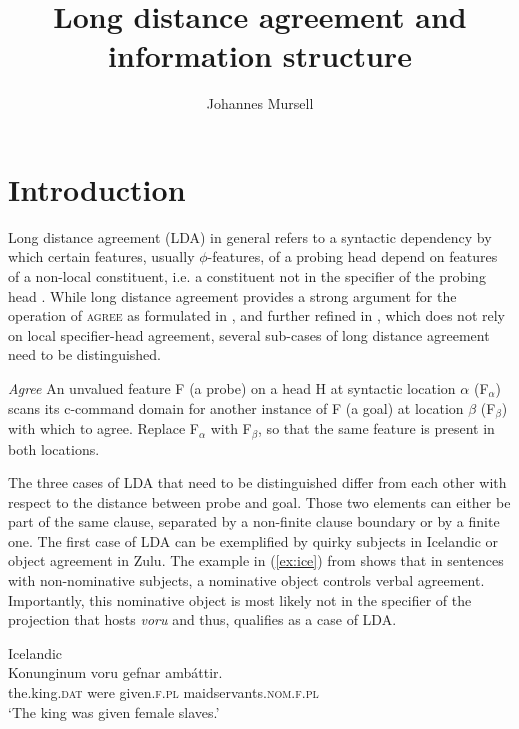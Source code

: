 \documentclass[output=paper
,modfonts
,nonflat]{langsci/langscibook}
\title{Long distance agreement and information structure}
\author{Johannes Mursell\affiliation{Goethe-Universität Frankfurt am Main}}
\begin{document}
\maketitle

\section{Introduction} 
Long distance agreement (LDA) in general refers to a syntactic dependency by which certain features, usually $ \phi $-features, of a probing head depend on features of a non-local constituent, i.e. a constituent not in the specifier of the probing head \citep{Bhatt_Keine2016}. While long distance agreement provides a strong argument for the operation of \textsc{agree} as formulated in \citet{Chomsky2000,Chomsky2001}, and further refined in \citet{Pesetsky_Torrego2007}, which does not rely on local specifier-head agreement, several sub-cases of long distance agreement need to be distinguished.
\begin{exe} 
\ex \label{def:agr_pt} \textit{Agree} \citep[][268]{Pesetsky_Torrego2007}
	\xlist
	\ex An unvalued feature F (a probe) on a head H at syntactic location $\alpha$ (F$_{\alpha}$) scans its c-command domain for another instance of F (a goal) at location $\beta$ (F$_{\beta}$) with which to agree. 
	\ex Replace F$_{\alpha}$ with F$_{\beta}$, so that the same feature is present in both locations.
	\endxlist
\end{exe}
The three cases of LDA that need to be distinguished differ from each other with respect to the distance between probe and goal. Those two elements can either be part of the same clause, separated by a non-finite clause boundary or by a finite one. The first case of LDA can be exemplified by quirky subjects in Icelandic or object agreement in Zulu. The example in (\ref{ex:ice}) from \citet{Zaenen_et_al1985} shows that in sentences with non-nominative subjects, a nominative object controls verbal agreement. Importantly, this nominative object is most likely not in the specifier of the projection that hosts \textit{voru} and thus, qualifies as a case of LDA.
\begin{exe} 
\ex Icelandic \citep[][460]{Zaenen_et_al1985}\label{ex:ice}\\ 
	\gll Konunginum voru gefnar amb\'{a}ttir.\\
	 the.king.\textsc{dat} were given.\textsc{f.pl} maidservants.\textsc{nom.f.pl}\\
	\glt `The king was given female slaves.'
\end{exe}
\end{document}
